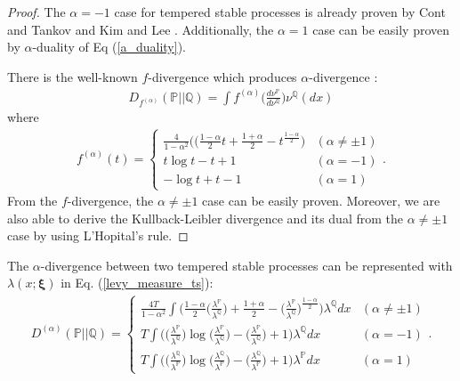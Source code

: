 \documentclass[preprint,11pt]{amsart}
\begin{document}
	\begin{proof}
	The $\alpha=-1$ case for tempered stable processes is already proven by Cont and Tankov \cite{cont2004nonparametric}and Kim and Lee \cite{ kim2007relative}. Additionally, the $\alpha=1$ case can be easily proven by $\alpha$-duality of Eq (\ref{a_duality}). 
	
	There is the well-known $f$-divergence which produces $\alpha$-divergence \cite{amari2000methods}:
	\begin{align}
		D_{f^{(\alpha)}}(\mathbb{P}||\mathbb{Q})=\int f^{(\alpha)}\Big(\frac{d\nu^\mathbb{P}}{d\nu^\mathbb{Q}}\Big)\nu^\mathbb{Q}(dx)
	\end{align}
	where
	\begin{align}
		f^{(\alpha)}(t)=\left\{ 
	\begin{array}{ll}
	\frac{4}{1-\alpha ^{2}}(\Big(\frac{1-\alpha}{2} t +\frac{1+\alpha}{2}-t^{\frac{1-\alpha}{2}}\Big) & (\alpha \neq \pm 1)\\ 
	t \log{t} - t +1 & (\alpha =-1)\\
	- \log{t} +t - 1 & (\alpha =1)
	\end{array}
	\right..
	\end{align}
	From the $f$-divergence, the $\alpha\neq\pm1$ case can be easily proven. Moreover, we are also able to derive the Kullback-Leibler divergence and its dual from the $\alpha\neq\pm1$ case by using L'Hopital's rule.
	\end{proof}
	
	The $\alpha$-divergence between two tempered stable processes can be represented with $\lambda(x;\boldsymbol{\xi})$ in Eq. (\ref{levy_measure_ts}):
	\begin{align}
	 \label{a_div_measure_ts_lambda}
	D^{(\alpha )}(\mathbb{P}||\mathbb{Q})=\left\{ 
	\begin{array}{ll}
	\frac{4T}{1-\alpha ^{2}}\int \Big(\frac{1-\alpha}{2}\Big(\frac{\lambda^\mathbb{P}}{\lambda^\mathbb{Q}}\Big) +\frac{1+\alpha}{2}-\Big(\frac{\lambda^\mathbb{P}}{\lambda^\mathbb{Q}}\Big)^{\frac{1-\alpha}{2}}\Big) \lambda^\mathbb{Q}dx & (\alpha \neq \pm 1)\\ 
	T\int \Big(\Big(\frac{\lambda^\mathbb{P}}{\lambda^\mathbb{Q}}\Big) \log{\Big(\frac{\lambda^\mathbb{P}}{\lambda^\mathbb{Q}}\Big)}- \Big(\frac{\lambda^\mathbb{P}}{\lambda^\mathbb{Q}}\Big)+1\Big) \lambda^\mathbb{Q}dx & (\alpha =-1)\\
	T\int \Big(\Big(\frac{\lambda^\mathbb{Q}}{\lambda^\mathbb{P}}\Big) \log{\Big(\frac{\lambda^\mathbb{Q}}{\lambda^\mathbb{P}}\Big)}- \Big(\frac{\lambda^\mathbb{Q}}{\lambda^\mathbb{P}}\Big)+1\Big) \lambda^\mathbb{P}dx & (\alpha =1)
	\end{array}
	\right..
	\end{align}
	
\end{document}
